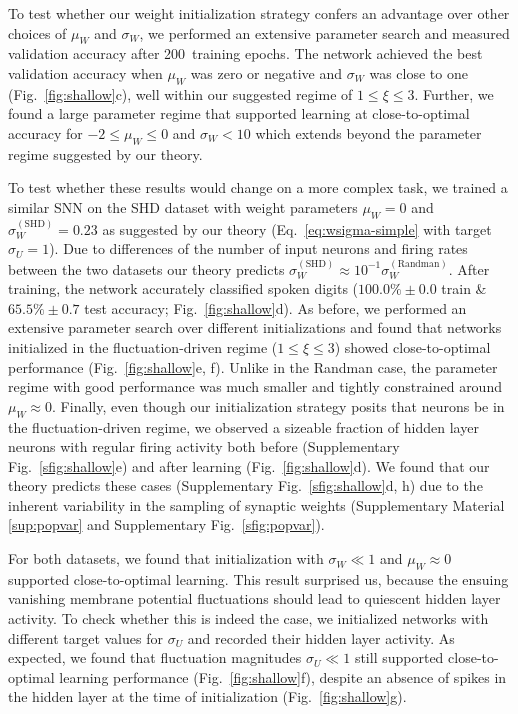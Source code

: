 \documentclass[11pt,a4paper]{article}
\begin{document}
To test whether our weight initialization strategy confers an advantage over
other choices of $\mu_W$ and $\sigma_W$, we performed an extensive parameter
search and measured validation accuracy after 200~training epochs.
The network achieved the best validation accuracy when $\mu_W$ was zero or
negative and $\sigma_W$ was close to one (Fig.~\ref{fig:shallow}c), well within
our suggested regime of $1 \leq \xi \leq 3$.
Further, we found a large parameter regime that supported learning at 
close-to-optimal accuracy for $-2 \leq \mu_W \leq 0$ and $\sigma_W < 10$ 
which extends beyond the parameter regime suggested by our theory.

To test whether these results would change on a more complex task, we trained a
similar \ac{SNN} on the \ac{SHD} dataset \cite{cramer_heidelberg_2020} with weight
parameters $\mu_W=0$ and $\sigma_W^\mathrm{(SHD)}= 0.23$ as suggested by
our theory (Eq.~\eqref{eq:wsigma-simple} with target $\sigma_U=1$).
Due to differences of the number of input neurons and firing rates between the
two datasets our theory predicts $\sigma_W^\mathrm{(SHD)} \approx 10^{-1} \sigma_W^\mathrm{(Randman)}$.
After training, the network accurately classified spoken digits ($100.0\%\pm0.0$ train \& $65.5\%\pm0.7$ test accuracy; Fig.~\ref{fig:shallow}d).
As before, we performed an extensive parameter search over different
initializations and found that networks initialized in the fluctuation-driven
regime ($1 \leq \xi \leq 3$) showed close-to-optimal performance
(Fig.~\ref{fig:shallow}e, f).
Unlike in the Randman case, the parameter regime with good performance was much
smaller and tightly constrained around $\mu_W \approx 0$.
Finally, even though our initialization strategy posits that neurons be in the
fluctuation-driven regime, we observed a sizeable fraction of hidden layer
neurons with regular firing activity both before (Supplementary Fig.~\ref{sfig:shallow}e) and after learning (Fig.~\ref{fig:shallow}d). 
We found that our theory predicts these cases (Supplementary Fig.~\ref{sfig:shallow}d, h) due to the inherent variability in the sampling of
synaptic weights (Supplementary Material \ref{sup:popvar} and Supplementary Fig.~\ref{sfig:popvar}).

For both datasets, we found that initialization with $\sigma_W \ll 1$ and
$\mu_W \approx 0$ supported close-to-optimal learning.
This result surprised us, because the ensuing vanishing membrane potential
fluctuations should lead to quiescent hidden layer activity.
To check whether this is indeed the case, we initialized networks with
different target values for $\sigma_U$ and recorded their hidden layer
activity.
As expected, we found that fluctuation magnitudes $\sigma_U \ll 1$ still
supported close-to-optimal learning performance (Fig.~\ref{fig:shallow}f),
despite an absence of spikes in the hidden layer at the time of initialization
(Fig.~\ref{fig:shallow}g).
\end{document}
